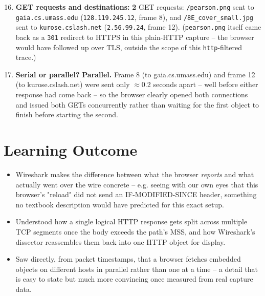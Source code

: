 \documentclass[11pt,a4paper]{article}
\begin{document}
\begin{enumerate}
\setcounter{enumi}{15}
\item \textbf{GET requests and destinations:} \textbf{2} GET requests: \texttt{/pearson.png}
sent to \texttt{gaia.cs.umass.edu} (\texttt{128.119.245.12}, frame 8), and
\texttt{/8E\_cover\_small.jpg} sent to \texttt{kurose.cslash.net} (\texttt{2.56.99.24},
frame 12). (\texttt{pearson.png} itself came back as a \texttt{301} redirect to HTTPS in
this plain-HTTP capture -- the browser would have followed up over TLS, outside the scope
of this \texttt{http}-filtered trace.)
\item \textbf{Serial or parallel?} \textbf{Parallel.} Frame 8 (to gaia.cs.umass.edu) and
frame 12 (to kurose.cslash.net) were sent only $\approx$0.2 seconds apart -- well before
either response had come back -- so the browser clearly opened both connections and issued
both GETs concurrently rather than waiting for the first object to finish before starting
the second.
\end{enumerate}

\section*{Learning Outcome}
\begin{itemize}
\item Wireshark makes the difference between what the browser \emph{reports} and what
actually went over the wire concrete -- e.g. seeing with our own eyes that this browser's
"reload" did not send an IF-MODIFIED-SINCE header, something no textbook description would
have predicted for this exact setup.
\item Understood how a single logical HTTP response gets split across multiple TCP
segments once the body exceeds the path's MSS, and how Wireshark's dissector reassembles
them back into one HTTP object for display.
\item Saw directly, from packet timestamps, that a browser fetches embedded objects on
different hosts in parallel rather than one at a time -- a detail that is easy to state but
much more convincing once measured from real capture data.
\end{itemize}
\end{document}
